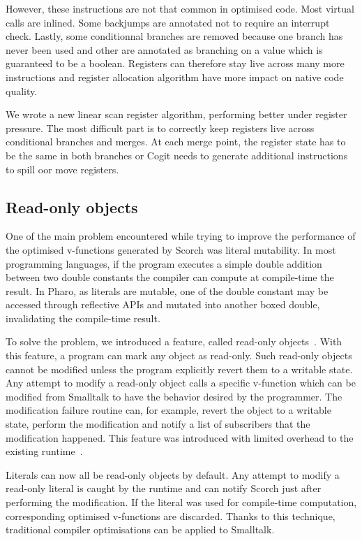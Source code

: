 \documentclass[a4paper,12pt,twoside]{../includes/ThesisStyle}
\begin{document}
However, these instructions are not that common in optimised code. Most virtual calls are inlined. Some backjumps are annotated not to require an interrupt check. Lastly, some conditionnal branches are removed because one branch has never been used and other are annotated as branching on a value which is guaranteed to be a boolean. Registers can therefore stay live across many more instructions and register allocation algorithm have more impact on native code quality.

We wrote a new linear scan register algorithm, performing better under register pressure. The most difficult part is to correctly keep registers live across conditional branches and merges. At each merge point, the register state has to be the same in both branches or Cogit needs to generate additional instructions to spill oor move registers.

\subsection{Read-only objects}

One of the main problem encountered while trying to improve the performance of the optimised v-functions generated by Scorch was literal mutability. In most programming languages, if the program executes a simple double addition between two double constants the compiler can compute at compile-time the result. In Pharo, as literals are mutable, one of the double constant may be accessed through reflective APIs and mutated into another boxed double, invalidating the compile-time result. 

To solve the problem, we introduced a feature, called read-only objects~\cite{Bera16b}. With this feature, a program can mark any object as read-only. Such read-only objects cannot be modified unless the program explicitly revert them to a writable state. Any attempt to modify a read-only object calls a specific v-function which can be modified from Smalltalk to have the behavior desired by the programmer. The modification failure routine can, for example, revert the object to a writable state, perform the modification and notify a list of subscribers that the modification happened. This feature was introduced with limited overhead to the existing runtime~\cite{Bera16b}. 

Literals can now all be read-only objects by default. Any attempt to modify a read-only literal is caught by the runtime and can notify Scorch just after performing the modification. If the literal was used for compile-time computation, corresponding optimised v-functions are discarded. Thanks to this technique, traditional compiler optimisations can be applied to Smalltalk.
\end{document}
